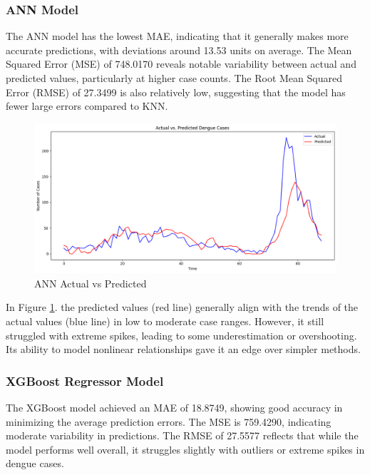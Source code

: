 \documentclass{article}
\begin{document}
\subsubsection{ANN Model}
The ANN model has the lowest MAE, indicating that it generally makes more accurate predictions, with deviations around 13.53 units on average. The Mean Squared Error (MSE) of 748.0170 reveals notable variability between actual and predicted values, particularly at higher case counts. The Root Mean Squared Error (RMSE) of 27.3499 is also relatively low, suggesting that the model has fewer large errors compared to KNN.
\begin{figure}[h!]
    \centering
    \includegraphics[width=1\linewidth]{image/Ann plot.png}
    \caption{ANN Actual vs Predicted}
    \label{fig:ann}
\end{figure}

In Figure \ref{fig:ann}. the predicted values (red line) generally align with the trends of the actual values (blue line) in low to moderate case ranges. However, it still struggled with extreme spikes, leading to some underestimation or overshooting. Its ability to model nonlinear relationships gave it an edge over simpler methods.

\subsubsection{XGBoost Regressor Model}
The XGBoost model achieved an MAE of 18.8749, showing good accuracy in minimizing the average prediction errors. The MSE is 759.4290, indicating moderate variability in predictions. The RMSE of 27.5577 reflects that while the model performs well overall, it struggles slightly with outliers or extreme spikes in dengue cases.
\end{document}
